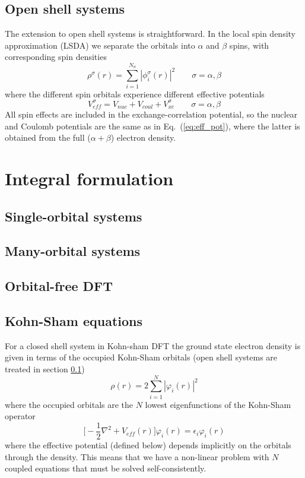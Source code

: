 \subsection{Open shell systems} \label{sec:open_shell_KS}
The extension to open shell systems is straightforward. In the local spin 
density approximation (LSDA) we separate the orbitals into $\alpha$ and 
$\beta$ spins, with corresponding spin densities 
\begin{equation}
    \rho^{\sigma} (r) = \sum_{i=1}^{N_{\sigma}} |\phi_i^{\sigma}(r)|^2 \qquad \sigma = \alpha, \beta
\end{equation} 
where the different spin orbitals experience different effective potentials
\begin{equation}
    V_{eff}^{\sigma} = V_{nuc} + V_{coul} + V_{xc}^{\sigma} \qquad \sigma = \alpha, \beta
\end{equation}
All spin effects are included in the exchange-correlation potential, so the 
nuclear and Coulomb potentials are the same as in Eq.~(\ref{eq:eff_pot}), 
where the latter is obtained from the full ($\alpha + \beta$) electron density.



\section{Integral formulation}

\subsection{Single-orbital systems}
\subsection{Many-orbital systems}
\subsection{Orbital-free DFT}


\subsection{Kohn-Sham equations}
For a closed shell system in Kohn-sham DFT the ground state electron density is given 
in terms of the occupied Kohn-Sham orbitals (open shell systems are 
treated in section \ref{sec:open_shell_KS})
\begin{equation}
    \rho(r) = 2 \sum_{i=1}^N |\varphi_i(r)|^2
\end{equation}
where the occupied orbitals are the $N$ lowest eigenfunctions of the 
Kohn-Sham operator
\begin{equation}
    \label{eq:KS-diff}
    \big[-\frac{1}{2}\nabla^2 + V_{eff}(r)\big] \varphi_i(r) = \epsilon_i \varphi_i(r)
\end{equation}
where the effective potential (defined below) depends implicitly on the 
orbitals through the density. This means that we have a non-linear problem with $N$ coupled 
equations that must be solved self-consistently.

